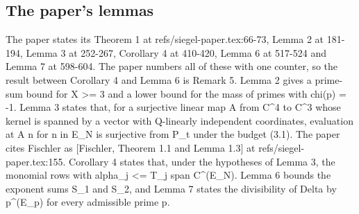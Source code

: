 \subsection{The paper's lemmas}

The paper \cite{openai-siegel-2026} states its Theorem 1 at refs/siegel-paper.tex:66-73, Lemma 2 at 181-194, Lemma 3 at 252-267, Corollary 4 at 410-420, Lemma 6 at 517-524 and Lemma 7 at 598-604.
The paper numbers all of these with one counter, so the result between Corollary 4 and Lemma 6 is Remark 5.
Lemma 2 gives a prime-sum bound for X >= 3 and a lower bound for the mass of primes with chi(p) = -1.
Lemma 3 states that, for a surjective linear map A from C\textasciicircum4 to C\textasciicircum3 whose kernel is spanned by a vector with Q-linearly independent coordinates, evaluation at A n for n in E\_N is surjective from P\_t under the budget (3.1).
The paper cites Fischler \cite{fischler2005} as [Fischler, Theorem 1.1 and Lemma 1.3] at refs/siegel-paper.tex:155.
Corollary 4 states that, under the hypotheses of Lemma 3, the monomial rows with alpha\_j <= T\_j span C\textasciicircum(E\_N).
Lemma 6 bounds the exponent sums S\_1 and S\_2, and Lemma 7 states the divisibility of Delta by p\textasciicircum(E\_p) for every admissible prime p.
